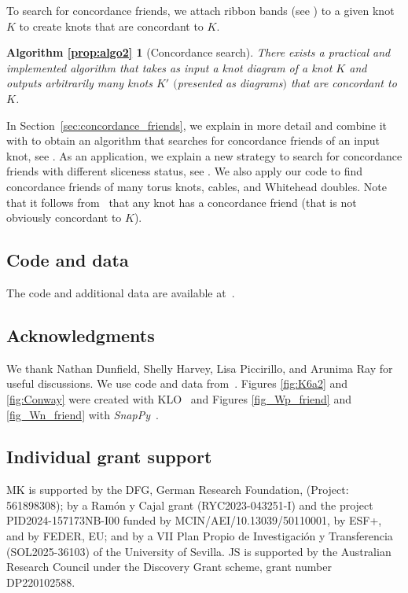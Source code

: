 \documentclass{amsart} %
\theoremstyle{thm}
\newtheorem*{prop:algo2}{Algorithm \ref{prop:algo2}}
\theoremstyle{definition}
\numberwithin{equation}{section}
\begin{document}
To search for concordance friends, we attach ribbon bands (see ) to a given knot $K$ to create knots that are concordant to $K$.

\begin{prop:algo2}[Concordance search]
    There exists a practical and implemented algorithm that takes as input a knot diagram of a knot $K$ and outputs arbitrarily many knots $K'$ $($presented as diagrams$)$ that are concordant to $K$.
\end{prop:algo2}

In Section~\ref{sec:concordance_friends}, we explain  in more detail and combine it with  to obtain an algorithm that searches for concordance friends of an input knot, see . As an application, we explain a new strategy to search for concordance friends with different sliceness status, see . We also apply our code to find concordance friends of many torus knots, cables, and Whitehead doubles. Note that it follows from~\cite[Theorem 1.2]{BKM_traces} that any knot has a concordance friend (that is not obviously concordant to $K$). 


\subsection*{Code and data}
The code and additional data are available at~\cite{data}.

\subsection*{Acknowledgments}
We thank Nathan Dunfield, Shelly Harvey, Lisa Piccirillo, and Arunima Ray for useful discussions. We use code and data from~\cite{SnapPy,Regina,sagemath,Dunfield_census,Dunfield_exterior_to_link,FPS_code,BKM_alt,BKM_QA,Kegel_Weiss,KnotInfo,CensusKnotInvariants,KLO,KnotJob,Dunfield_Gong}. Figures \ref{fig:K6a2} and \ref{fig:Conway} were created with KLO~\cite{KLO} and Figures \ref{fig_Wp_friend} and \ref{fig_Wn_friend} with {\em SnapPy}~\cite{SnapPy}.

\subsection*{Individual grant support}
MK is supported by the DFG, German Research Foundation, (Project: 561898308); by a Ram\'on y Cajal grant (RYC2023-043251-I) and the project PID2024-157173NB-I00 funded by MCIN/AEI/10.13039/50110001, by ESF+, and by FEDER, EU; and by a VII Plan Propio de Investigación y Transferencia (SOL2025-36103) of the University of Sevilla. JS is supported by the Australian Research Council under the Discovery Grant scheme, grant number DP220102588.
\end{document}
